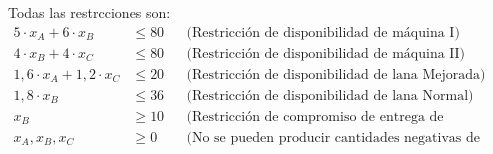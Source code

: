 \documentclass[../main.tex]{subfiles}
\begin{document}
\begin{exercise}
\begin{enumerate}
                    Todas las restrcciones son:
                    \begin{equation}
                        \begin{aligned}
                            5 \cdot x_A + 6 \cdot x_B &\leq 80 && \text{(Restricción de disponibilidad de máquina I)} \\
                            4 \cdot x_B + 4 \cdot x_C &\leq 80 && \text{(Restricción de disponibilidad de máquina II)}\\
                            1,6 \cdot x_A + 1,2 \cdot x_C &\leq 20 && \text{(Restricción de disponibilidad de lana Mejorada)}\\
                            1,8 \cdot x_B &\leq 36 && \text{(Restricción de disponibilidad de lana Normal)}\\
                            x_B &\geq 10 && \text{(Restricción de compromiso de entrega de pullóveres B)}\\
                            x_A, x_B, x_C & \geq 0 && \text{(No se pueden producir cantidades negativas de productos)}\\
                        \end{aligned}
                    \end{equation}
            \end{enumerate}


        \end{exercise}
\end{document}
